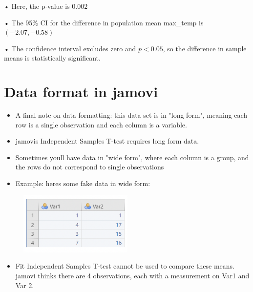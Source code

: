 \documentclass[
  letterpaper,
  DIV=11,
  numbers=noendperiod]{scrreprt}
\providecommand{\tightlist}{%
  \setlength{\itemsep}{0pt}\setlength{\parskip}{0pt}}\usepackage{longtable,booktabs,array}
\begin{document}
• Here, the p-value is \(0.002\)

• The 95\% CI for the difference in population mean max\_temp is
\((−2.07, −0.58)\)

• The confidence interval excludes zero and \(p < 0.05\), so the
difference in sample means is statistically significant.

\hypertarget{data-format-in-jamovi}{%
\section{Data format in jamovi}\label{data-format-in-jamovi}}

\begin{itemize}
\item
  A final note on data formatting: this data set is in "long form",
  meaning each row is a single observation and each column is a
  variable.
\item
  jamovi\textquotesingle s Independent Samples T-test requires long form
  data.
\end{itemize}

\begin{itemize}
\tightlist
\item
  Sometimes you\textquotesingle ll have data in "wide form", where each
  column is a group, and the rows do not correspond to single
  observations
\end{itemize}

\begin{itemize}
\tightlist
\item
  Example: here\textquotesingle s some fake data in wide form:
\end{itemize}

\begin{figure}

{\centering \includegraphics[width=2.21875in,height=\textheight]{images/mod1_21.png}

}

\end{figure}

\begin{itemize}
\tightlist
\item
  Fit Independent Samples T-test cannot be used to compare these means.~
  jamovi thinks there are 4 observations, each with a measurement on
  Var1 and Var 2.~
\end{itemize}
\end{document}
